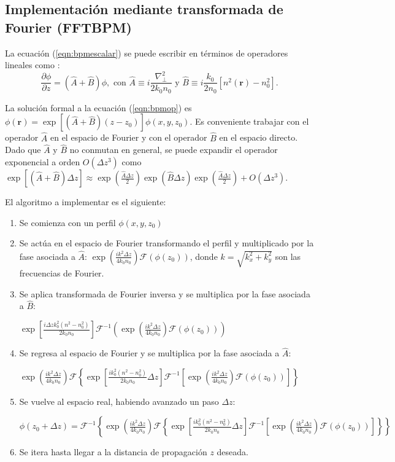\subsection{Implementación mediante transformada de Fourier (FFTBPM)}
La ecuación (\ref{eqn:bpmescalar}) se puede escribir en términos de operadores lineales como \citep{bpm}: 
\begin{equation}
	\frac{\partial \phi}{\partial z}  = \left(\hat{A} + \hat{B}\right)\phi, \text{ con } \hat{A} \equiv i\frac{\nabla^2_\perp}{2k_0n_0}\text{ y } \hat{B} \equiv i\frac{k_0}{2n_0}\left[n^2(\textbf{r})-n_0^2\right]. \label{eqn:bpmop}
\end{equation}

La solución formal a la ecuación (\ref{eqn:bpmop}) es $\phi(\textbf{r}) = \exp\left[\left(\hat{A} + \hat{B}\right)(z-z_0)\right]\phi(x, y, z_0)$. Es conveniente trabajar con el operador $\hat{A}$ en el espacio de Fourier y con el operador $\hat{B}$ en el espacio directo. Dado que $\hat{A}$ y $\hat{B}$ no conmutan en general, se puede expandir el operador exponencial a orden $O(\Delta z ^3)$ como $\exp\left[\left(\hat{A} + \hat{B}\right)\Delta z \right] \approx \exp\left(\frac{\hat{A}\Delta z}{2} \right)\exp\left(\hat{B}\Delta z \right)\exp\left(\frac{\hat{A}\Delta z}{2} \right) + O(\Delta z ^3)$.

El algoritmo a implementar es el siguiente:
\begin{enumerate}
	\item   Se comienza con un perfil $\phi(x, y, z_0)$
\item   Se actúa en el espacio de Fourier transformando el perfil y multiplicado por la fase asociada a $\hat{A}$: $\exp\left(\frac{ik^2\Delta z}{4k_0 n_0}\right)\mathcal{F}(\phi(z_0))$, donde $k=\sqrt{k_x^2 + k_y^2}$ son las frecuencias de Fourier.
\item   Se aplica transformada de Fourier inversa y se multiplica por la fase asociada a $\hat{B}$: 

$\exp\left[\frac{i\Delta z k_0^2(n^2-n_0^2)}{2 k_0n_0}\right]\mathcal{F}^{-1}\left(\exp\left(\frac{ik^2 \Delta z}{4k_0 n_0}\right)\mathcal{F}(\phi(z_0))\right)$
\item  Se regresa al espacio de Fourier y se multiplica por la fase asociada a $\hat{A}$:
 
$\exp\left(\frac{ik^2\Delta z}{4k_0 n_0}\right)\mathcal{F}\left\{\exp\left[\frac{ik_0^2(n^2-n_0^2)}{2 k_0n_0}\Delta z \right]\mathcal{F}^{-1}\left[\exp\left(\frac{ik^2\Delta z}{4k_0 n_0}\right)\mathcal{F}(\phi(z_0))\right]\right\}$
\item Se vuelve al espacio real, habiendo avanzado un paso $\Delta z$:

$\phi(z_0+\Delta z)=\mathcal{F}^{-1}\left\{\exp\left(\frac{ik^2\Delta z}{4k_0 n_0}\right)\mathcal{F}\left\{\exp\left[\frac{i k_0^2(n^2-n_0^2)}{2 k_0n_0}\Delta z\right]\mathcal{F}^{-1}\left[\exp\left(\frac{ik^2\Delta z}{4k_0 n_0}\right)\mathcal{F}(\phi(z_0))\right]\right\} \right\}$

\item Se itera hasta llegar a la distancia de propagación $z$ deseada.
\end{enumerate}

